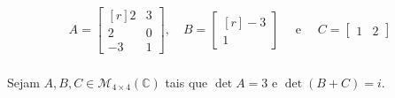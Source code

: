 \grupo{}

\exercicio{}

\begin{align*}
	A = 
	\begin{bmatrix*}[r]
		2  & 3\\
		2  & 0\\
		-3 & 1
	\end{bmatrix*},\quad
	B = 
	\begin{bmatrix*}[r]
		-3\\
		1
	\end{bmatrix*}\quad \text{ e }\quad
	C =
	\begin{bmatrix*}
		1 & 2
	\end{bmatrix*}
\end{align*}


\exercicio{}

\paragraph{}Sejam $A, B, C \in \mathcal{M}_{4 \times 4}(\mathbb{C})$ tais que
$\det A = 3$ e $\det(B + C) = i$.

